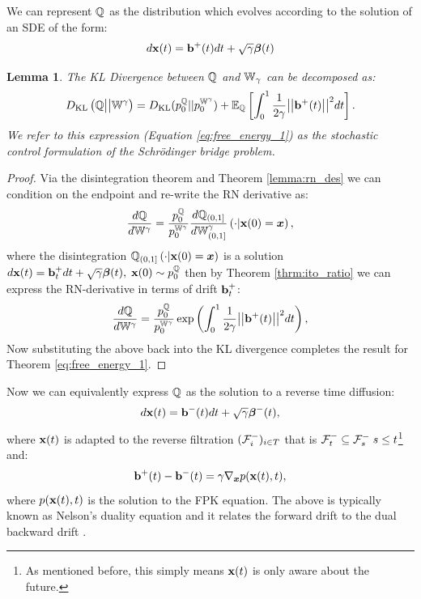 \documentclass[a4paper,12pt,twoside,openright]{report}
\newtheorem{lemma}{Lemma}
\theoremstyle{definition}
\begin{document}
We can represent ${\mathbb{Q}}$ as the distribution which evolves according to the solution of an SDE of the form:
\begin{align*}
    d{\mathbf{x}}(t) = {\mathbf{b}}^{+}(t) dt + \sqrt{\gamma} {\bm{\beta}}(t)
\end{align*}
\begin{lemma}\citep{pavon1991free}
    The KL Divergence between ${\mathbb{Q}}$ and $\mathbb{W}_{\gamma}$ can be decomposed as:
\begin{align}\label{eq:free_energy_1}
     D_{\mathrm{KL}}\left({\mathbb{Q}} \big|\big| \mathbb{W}^{\gamma}\right) = D_{\mathrm{KL}}(p^{{\mathbb{Q}}}_0 || p_0^{ \mathbb{W}^{\gamma}}) + \mathbb{E}_{\mathbb{Q}}\left[\int_0^1 \frac{1}{2\gamma}\big|\big|{\mathbf{b}}^{+}(t) \big|\big|^2 dt\right].
\end{align}
We refer to this expression (Equation \ref{eq:free_energy_1}) as the stochastic control formulation of the Schrödinger bridge problem.
\end{lemma}
\begin{proof}
Via the disintegration theorem and Theorem \ref{lemma:rn_des} we can condition on the endpoint and re-write the RN derivative as:
\begin{align*}
    \frac{d{\mathbb{Q}}}{d\mathbb{W}^{ \gamma}} = \frac{p_0^{\mathbb{Q}}}{p_0^{ \mathbb{W}^{\gamma}}} \frac{d{\mathbb{Q}}_{(0,1]}}{d\mathbb{W}_{(0,1]}^{\gamma}}\left(\cdot | {\mathbf{x}}(0) ={\bm{x}}\right),
\end{align*}
where the disintegration ${\mathbb{Q}}_{(0,1]}\left(\cdot | {\mathbf{x}}(0) = {\bm{x}} \right)$ is a solution $d{\mathbf{x}}(t) = {\mathbf{b}}_t^+ dt + \sqrt{\gamma} {\bm{\beta}}(t), \; {\mathbf{x}}(0) \sim p_0^{\mathbb{Q}}$ then by Theorem \ref{thrm:ito_ratio} we can express the RN-derivative in terms of  drift ${\mathbf{b}}_t^+$:
\begin{align*}
    \frac{d{\mathbb{Q}}}{d\mathbb{W}^{\gamma}} = \frac{p_0^{\mathbb{Q}}}{p_0^{ \mathbb{W}^{\gamma}}}\exp\left(\int_0^1\frac{1}{2\gamma} \big|\big|{\mathbf{b}}^+(t)\big|\big|^2 dt\right),
\end{align*}
Now substituting the above back into the KL divergence completes the result for Theorem \ref{eq:free_energy_1}.
\end{proof}
Now we can equivalently express ${\mathbb{Q}}$ as the solution to a reverse time diffusion:
\begin{align}
    d{\mathbf{x}}(t) = {\mathbf{b}}^{-}(t) dt + \sqrt{\gamma} {\bm{\beta}}^{-}(t), 
\end{align}
where ${\mathbf{x}}(t)$ is adapted to the reverse filtration $({\mathcal{F}}^{-}_i)_{i\in T}$ that is ${\mathcal{F}}^{-}_t \subseteq {\mathcal{F}}^{-}_s \; s \leq t$\footnote{As mentioned before, this simply means ${\mathbf{x}}(t)$  is only aware about the future.} and:
\begin{align}\label{eq:nelson}
    {{\mathbf{b}}^{+}(t) - {\mathbf{b}}^{-}(t)} =\gamma \nabla_{{\bm{x}}} p({\mathbf{x}}(t), t),
\end{align}
where $p({\mathbf{x}}(t), t)$ is the solution to the FPK equation. The above is typically known as Nelson's duality equation and it relates the forward drift to the dual backward drift \citep{nelson1967dynamical}. 
\end{document}
